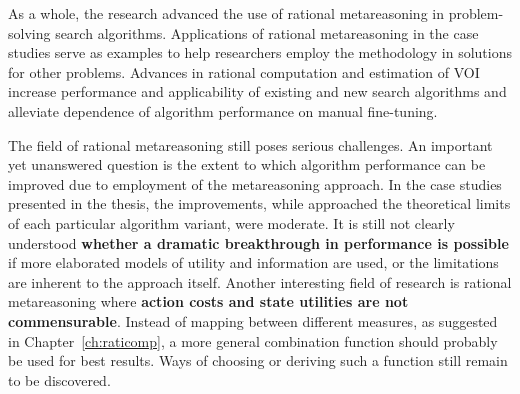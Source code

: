 As a whole, the research advanced the use of rational
metareasoning in problem-solving search algorithms. Applications of
rational metareasoning in the case studies serve as examples
to help researchers employ the methodology in solutions for other
problems. Advances in rational computation and estimation of VOI increase
performance and applicability of existing and new search algorithms
and alleviate dependence of algorithm performance on manual
fine-tuning.

The field of rational metareasoning still poses serious
challenges. An important yet unanswered question is the extent
to which algorithm performance can be improved due to employment of
the metareasoning approach. In the case studies presented in the thesis,
the improvements, while approached the theoretical limits of each
particular algorithm variant, were moderate. It is still not clearly
understood \textbf{whether a dramatic breakthrough in performance is possible}
if more elaborated models of utility and information are used, or the 
limitations are inherent to the approach itself. Another interesting
field of research is rational metareasoning where \textbf{action costs and
state utilities are not commensurable}. Instead of mapping between
different measures, as suggested in Chapter~\ref{ch:raticomp}, a
more general combination function should probably be used for best
results. Ways of choosing or deriving such a function still remain
to be discovered.
